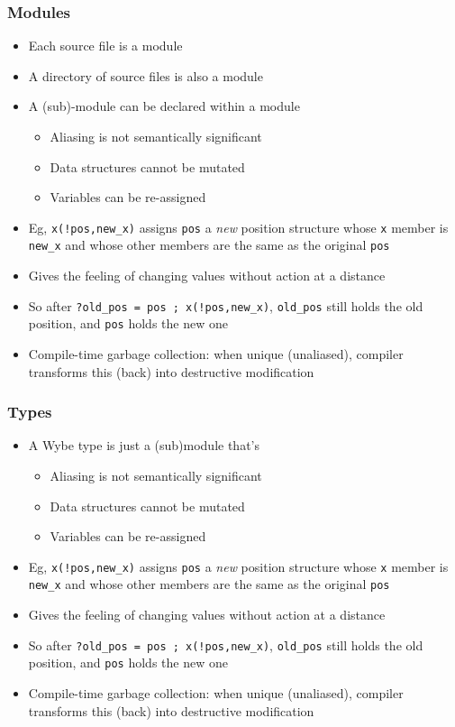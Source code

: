 \documentclass[12pt]{beamer}
\begin{document}
\begin{frame}[fragile]
\frametitle{Modules}
\begin{itemize}
\item Each source file is a module
\item A directory of source files is also a module
\item A (sub)-module can be declared within a module
  \begin{itemize}
  \item Aliasing is not semantically significant
  \item Data structures cannot be mutated
  \item Variables can be re-assigned
  \end{itemize}
\item Eg, \texttt{x(!pos,new\_x)} assigns \texttt{pos}
  a \emph{new} position structure whose \texttt{x} member is \texttt{new\_x} and
  whose other members are the same as the original \texttt{pos}
\item Gives the feeling of changing values without action at a distance
\item So after \texttt{?old\_pos = pos ; x(!pos,new\_x)}, \texttt{old\_pos}
  still holds the old position, and \texttt{pos} holds the new one
\item Compile-time garbage collection:  when unique (unaliased),
  compiler transforms this (back) into destructive modification
\end{itemize}
\end{frame}


\begin{frame}[fragile]
\frametitle{Types}
\begin{itemize}
\item A Wybe type is just a (sub)module that's 
  \begin{itemize}
  \item Aliasing is not semantically significant
  \item Data structures cannot be mutated
  \item Variables can be re-assigned
  \end{itemize}
\item Eg, \texttt{x(!pos,new\_x)} assigns \texttt{pos}
  a \emph{new} position structure whose \texttt{x} member is \texttt{new\_x} and
  whose other members are the same as the original \texttt{pos}
\item Gives the feeling of changing values without action at a distance
\item So after \texttt{?old\_pos = pos ; x(!pos,new\_x)}, \texttt{old\_pos}
  still holds the old position, and \texttt{pos} holds the new one
\item Compile-time garbage collection:  when unique (unaliased),
  compiler transforms this (back) into destructive modification
\end{itemize}
\end{frame}
\end{document}
